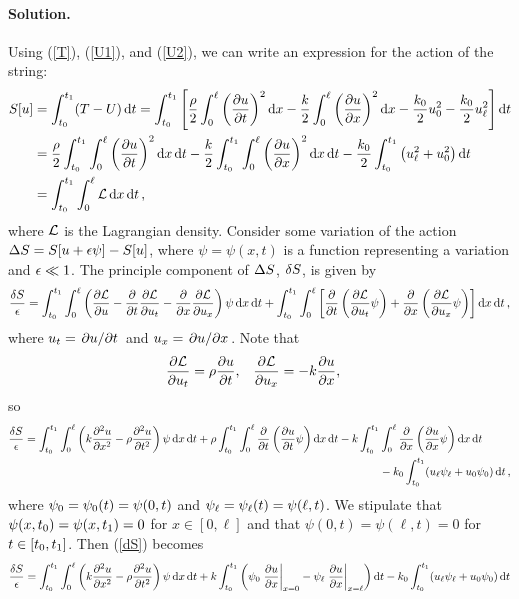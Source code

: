 \documentclass[11pt]{article}
\newcommand{\refeq}[1]{(\ref{#1})}
\newenvironment{solution}
{
    \paragraph{Solution.}
    \ignorespaces
}
{
}
\begin{document}
\begin{solution}
	Using \refeq{T}, \refeq{U1}, and \refeq{U2}, we can write an expression for the action of the string:
	\begin{align} \label{action}
		S[u] &= \int_{t_0}^{t_1} (T - U) \dd{t} = \int_{t_0}^{t_1} \left[ \frac{\rho}{2} \int_0^\ell \bigg( \pdv{u}{t} \bigg)^2 \dd{x} - \frac{k}{2} \int_0^\ell \bigg( \pdv{u}{x} \bigg)^2 \dd{x} - \frac{k_0}{2} u_0^2 - \frac{k_0}{2} u_\ell^2 \right] \dd{t} \\
		&= \frac{\rho}{2} \int_{t_0}^{t_1} \int_0^\ell \bigg( \pdv{u}{t} \bigg)^2 \dd{x} \dd{t} - \frac{k}{2} \int_{t_0}^{t_1} \int_0^\ell \bigg( \pdv{u}{x} \bigg)^2 \dd{x} \dd{t} - \frac{k_0}{2} \int_{t_0}^{t_1} \left( u_\ell^2 + u_0^2 \right) \dd{t} \\
		&= \int_{t_0}^{t_1} \int_0^\ell \mathcal{L} \dd{x} \dd{t},
	\end{align}
	where $\mathcal{L}$ is the Lagrangian density.  Consider some variation of the action $\Delta S = S[u + \epsilon \psi] - S[u]$, where $\psi = \psi(x, t)$ is a function representing a variation and $\epsilon \ll 1$.  The principle component of $\Delta S$, $\delta S$, is given by
	\begin{equation}
		\frac{\delta S}{\epsilon} = \int_{t_0}^{t_1} \int_0^\ell \left( \pdv{\mathcal{L}}{u} - \pdv{}{t} \pdv{\mathcal{L}}{u_t} - \pdv{}{x} \pdv{\mathcal{L}}{u_x} \right) \psi \dd{x} \dd{t} + \int_{t_0}^{t_1} \int_0^\ell \left[ \pdv{}{t} \left( \pdv{\mathcal{L}}{u_t} \psi \right) + \pdv{}{x} \left( \pdv{\mathcal{L}}{u_x} \psi \right) \right] \dd{x} \dd{t},
	\end{equation}
	where $u_t = \pdv*{u}{t}$ and $u_x = \pdv*{u}{x}$.  Note that
	\begin{align}
		\pdv{\mathcal{L}}{u_t} &= \rho \pdv{u}{t}, &
		\pdv{\mathcal{L}}{u_x} &= -k \pdv{u}{x},
	\end{align}
	so
	\begin{align} \label{dS}
		\frac{\delta S}{\epsilon} = \int_{t_0}^{t_1} \int_0^\ell \left( k \pdv[2]{u}{x} - \rho \pdv[2]{u}{t} \right) \psi \dd{x} \dd{t} + \rho \int_{t_0}^{t_1} \int_0^\ell \pdv{}{t} \left( \pdv{u}{t} \psi \right) \dd{x} \dd{t} - k \int_{t_0}^{t_1} &\int_0^\ell \pdv{}{x} \left( \pdv{u}{x} \psi \right) \dd{x} \dd{t} \notag \\
		& - k_0 \int_{t_0}^{t_1} (u_\ell \psi_\ell + u_0 \psi_0) \dd{t} ,
	\end{align}
	where $\psi_0 = \psi_0(t) = \psi(0, t)$ and $\psi_\ell = \psi_\ell(t) = \psi(\ell, t)$.  We stipulate that $\psi(x, t_0) = \psi(x, t_1) = 0$ for $x \in [0, \ell]$ and that $\psi(0, t) = \psi(\ell, t) = 0$ for $t \in [t_0, t_1]$.  Then \refeq{dS} becomes
	\begin{align}
		\frac{\dS}{\eps} &= \intt \intx \left( k \pdv[2]{u}{x} - \rho \pdv[2]{u}{t} \right) \psi \dd{x} \dd{t} + k \intt \left( \psio \left. \pdv{u}{x} \right|_{x=0} - \psil \left. \pdv{u}{x} \right|_{x=\ell} \right) \dd{t} - \ko \intt (\uel \psil + \uo \psio) \dd{t} \label{psit} \\

\end{align}
\end{solution}
\end{document}
